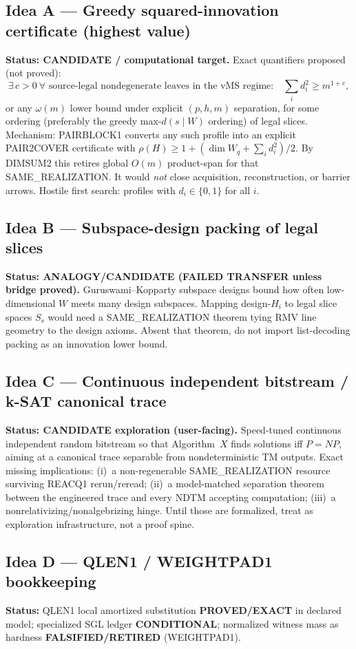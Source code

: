 \documentclass[11pt]{article}
\begin{document}
\subsection*{Idea A --- Greedy squared-innovation certificate (highest value)}
\textbf{Status: CANDIDATE / computational target.}
Exact quantifiers proposed (not proved):
\[
\exists\,c>0\ \forall\text{ source-legal nondegenerate leaves in the vMS regime:}\quad
\sum_i d_i^2\ge m^{1+c},
\]
or any $\omega(m)$ lower bound under explicit $(p,h,m)$ separation, for some ordering
(preferably the greedy max-$d(s\mid W)$ ordering) of legal slices.
Mechanism: PAIRBLOCK1 converts any such profile into an explicit PAIR2COVER certificate
with $\rho(H)\ge 1+(\dim W_q+\sum_i d_i^2)/2$. By DIMSUM2 this retires global $O(m)$
product-span for that SAME\_REALIZATION. It would \emph{not} close acquisition, reconstruction,
or barrier arrows. Hostile first search: profiles with $d_i\in\{0,1\}$ for all $i$.

\subsection*{Idea B --- Subspace-design packing of legal slices}
\textbf{Status: ANALOGY/CANDIDATE (FAILED TRANSFER unless bridge proved).}
Guruswami--Kopparty subspace designs bound how often low-dimensional $W$ meets many design
subspaces. Mapping design-$H_i$ to legal slice spaces $S_s$ would need a SAME\_REALIZATION
theorem tying RMV line geometry to the design axioms. Absent that theorem, do not import
list-decoding packing as an innovation lower bound.

\subsection*{Idea C --- Continuous independent bitstream / k-SAT canonical trace}
\textbf{Status: CANDIDATE exploration (user-facing).}
Speed-tuned continuous independent random bitstream so that Algorithm~$X$ finds solutions iff
$P=NP$, aiming at a canonical trace separable from nondeterministic TM outputs.
Exact missing implications: (i)~a non-regenerable SAME\_REALIZATION resource surviving REACQ1
rerun/reread; (ii)~a model-matched separation theorem between the engineered trace and every
NDTM accepting computation; (iii)~a nonrelativizing/nonalgebrizing hinge. Until those are
formalized, treat as exploration infrastructure, not a proof spine.

\subsection*{Idea D --- QLEN1 / WEIGHTPAD1 bookkeeping}
\textbf{Status:} QLEN1 local amortized substitution \textbf{PROVED/EXACT} in declared model;
specialized SGL ledger \textbf{CONDITIONAL}; normalized witness mass as hardness
\textbf{FALSIFIED/RETIRED} (WEIGHTPAD1).
\end{document}
